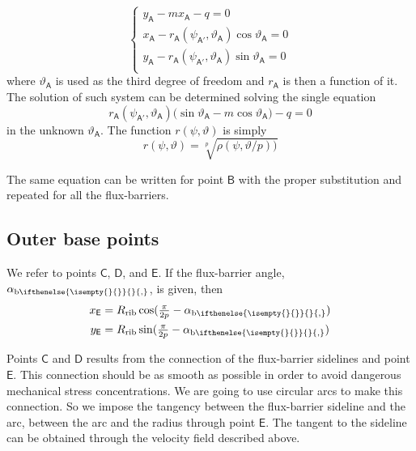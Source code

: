 \documentclass[b5paper,11pt,oneside,fleqn]{article}
\newcommand{\ped}[1]{_\textup{#1}}
\newcommand{\pt}[1]{\mathsf{#1}}
\newcommand{\te}{\vartheta}
\newcommand{\ab}[1][]{%
\alpha_{\textup{b}
\ifthenelse{\isempty{#1}{}}{}{,#1}%
}}
\newcommand{\pih}[1][]{\tfrac{\pi}{2#1}}
\begin{document}
\begin{equation}
\begin{cases}
y_\pt{A} - m x_\pt{A} - q = 0 \\
x_\pt{A} - r_\pt{A}(\psi_\pt{A'},\te_\pt{A}) \cos\te_\pt{A} = 0 \\
y_\pt{A} - r_\pt{A}(\psi_\pt{A'},\te_\pt{A}) \sin\te_\pt{A} = 0 \\
\end{cases}
\end{equation}
where $ \te_\pt{A} $ is used as the third degree of freedom and $ r_\pt{A} $ is
then a function of it.
The solution of such system can be determined solving the single equation
\begin{equation}
r_\pt{A}(\psi_\pt{A'},\te_\pt{A})
\bigl( \sin\te_\pt{A} - m \cos\te_\pt{A} \bigr) - q = 0
\end{equation}
in the unknown $ \te_\pt{A} $.
The function $ r(\psi,\te) $ is simply
\[
r(\psi,\te) = \sqrt[p]{ \rho(\psi,\te/p) \bigr) }
\]

The same equation can be written for point $ \pt{B} $ with the proper
substitution and repeated for all the flux-barriers.



\subsection{Outer base points}
We refer to points $ \pt{C} $, $ \pt{D} $, and $ \pt{E} $.
If the flux-barrier angle, $ \ab $, is given, then
\begin{equation}
\begin{aligned}
x_\pt{E} &= R\ped{rib} \cos(\pih[p] - \ab) \\
y_\pt{E} &= R\ped{rib} \sin(\pih[p] - \ab)
\end{aligned}
\end{equation}

Points $ \pt{C} $ and $ \pt{D} $ results from the connection of the
flux-barrier sidelines and point $ \pt{E} $.
This connection should be as smooth as possible in order to
avoid dangerous mechanical stress concentrations.
We are going to use circular arcs to make this connection.
So we impose the tangency between the flux-barrier sideline and the arc,
between the arc and the radius through point $ \pt{E} $.
The tangent to the sideline can be obtained through the velocity field
described above.
\end{document}
